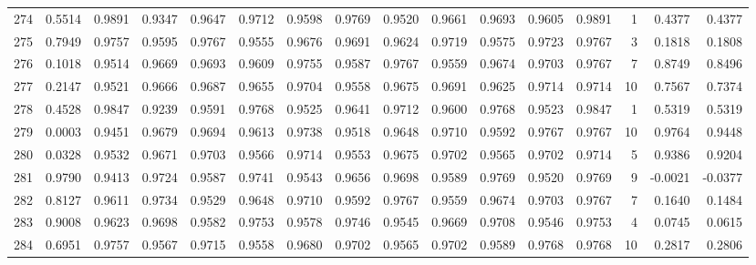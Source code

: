 \begin{tabular}{lrrrrrrrrrrrrrrr}
274 &      0.5514 &  0.9891 &  0.9347 &  0.9647 &  0.9712 &  0.9598 &  0.9769 &  0.9520 &  0.9661 &  0.9693 &   0.9605 &     0.9891 &      1 &                    0.4377 &                     0.4377 \\
275 &      0.7949 &  0.9757 &  0.9595 &  0.9767 &  0.9555 &  0.9676 &  0.9691 &  0.9624 &  0.9719 &  0.9575 &   0.9723 &     0.9767 &      3 &                    0.1818 &                     0.1808 \\
276 &      0.1018 &  0.9514 &  0.9669 &  0.9693 &  0.9609 &  0.9755 &  0.9587 &  0.9767 &  0.9559 &  0.9674 &   0.9703 &     0.9767 &      7 &                    0.8749 &                     0.8496 \\
277 &      0.2147 &  0.9521 &  0.9666 &  0.9687 &  0.9655 &  0.9704 &  0.9558 &  0.9675 &  0.9691 &  0.9625 &   0.9714 &     0.9714 &     10 &                    0.7567 &                     0.7374 \\
278 &      0.4528 &  0.9847 &  0.9239 &  0.9591 &  0.9768 &  0.9525 &  0.9641 &  0.9712 &  0.9600 &  0.9768 &   0.9523 &     0.9847 &      1 &                    0.5319 &                     0.5319 \\
279 &      0.0003 &  0.9451 &  0.9679 &  0.9694 &  0.9613 &  0.9738 &  0.9518 &  0.9648 &  0.9710 &  0.9592 &   0.9767 &     0.9767 &     10 &                    0.9764 &                     0.9448 \\
280 &      0.0328 &  0.9532 &  0.9671 &  0.9703 &  0.9566 &  0.9714 &  0.9553 &  0.9675 &  0.9702 &  0.9565 &   0.9702 &     0.9714 &      5 &                    0.9386 &                     0.9204 \\
281 &      0.9790 &  0.9413 &  0.9724 &  0.9587 &  0.9741 &  0.9543 &  0.9656 &  0.9698 &  0.9589 &  0.9769 &   0.9520 &     0.9769 &      9 &                   -0.0021 &                    -0.0377 \\
282 &      0.8127 &  0.9611 &  0.9734 &  0.9529 &  0.9648 &  0.9710 &  0.9592 &  0.9767 &  0.9559 &  0.9674 &   0.9703 &     0.9767 &      7 &                    0.1640 &                     0.1484 \\
283 &      0.9008 &  0.9623 &  0.9698 &  0.9582 &  0.9753 &  0.9578 &  0.9746 &  0.9545 &  0.9669 &  0.9708 &   0.9546 &     0.9753 &      4 &                    0.0745 &                     0.0615 \\
284 &      0.6951 &  0.9757 &  0.9567 &  0.9715 &  0.9558 &  0.9680 &  0.9702 &  0.9565 &  0.9702 &  0.9589 &   0.9768 &     0.9768 &     10 &                    0.2817 &                     0.2806 \\

\end{tabular}
